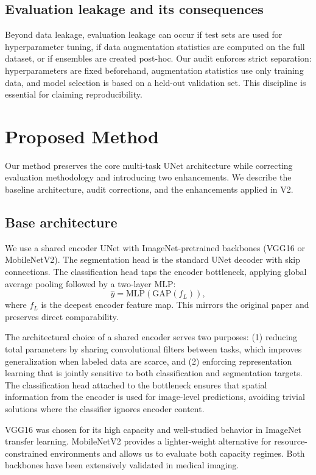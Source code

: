 \documentclass[conference,a4paper]{IEEEtran}
\begin{document}
\subsection{Evaluation leakage and its consequences}
Beyond data leakage, evaluation leakage can occur if test sets are used for hyperparameter tuning, if data augmentation statistics are computed on the full dataset, or if ensembles are created post-hoc. Our audit enforces strict separation: hyperparameters are fixed beforehand, augmentation statistics use only training data, and model selection is based on a held-out validation set. This discipline is essential for claiming reproducibility.

\section{Proposed Method}
Our method preserves the core multi-task UNet architecture while correcting evaluation methodology and introducing two enhancements. We describe the baseline architecture, audit corrections, and the enhancements applied in V2.

\subsection{Base architecture}
We use a shared encoder UNet with ImageNet-pretrained backbones (VGG16 or MobileNetV2). The segmentation head is the standard UNet decoder with skip connections. The classification head taps the encoder bottleneck, applying global average pooling followed by a two-layer MLP:
\begin{equation}
\hat{y} = \mathrm{MLP}(\mathrm{GAP}(f_L)),
\end{equation}
where $f_L$ is the deepest encoder feature map. This mirrors the original paper and preserves direct comparability.

The architectural choice of a shared encoder serves two purposes: (1) reducing total parameters by sharing convolutional filters between tasks, which improves generalization when labeled data are scarce, and (2) enforcing representation learning that is jointly sensitive to both classification and segmentation targets. The classification head attached to the bottleneck ensures that spatial information from the encoder is used for image-level predictions, avoiding trivial solutions where the classifier ignores encoder content.

VGG16 was chosen for its high capacity and well-studied behavior in ImageNet transfer learning. MobileNetV2 provides a lighter-weight alternative for resource-constrained environments and allows us to evaluate both capacity regimes. Both backbones have been extensively validated in medical imaging.
\end{document}
